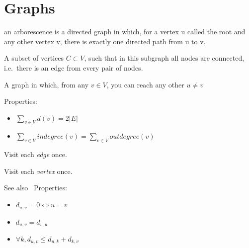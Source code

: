 \section{Graphs}

\begin{definition}[Arborescence]
    an arborescence is a directed graph in which, for a vertex u called the
    root and any other vertex v, there is exactly one directed path from u to v.
 \end{definition}

\begin{definition}[Clique]
    A subset of vertices $C \subset V$, such that in this subgraph all nodes
    are connected, i.e.\ there is an edge from every pair of nodes.
\end{definition}

\begin{definition}
    A graph in which, from any $v \in V$, you can reach any other $u \neq v$
\end{definition}

\begin{definition}
    Properties:
    \begin{itemize}
        \item $\sum\limits_{v \in V}{d(v)} = 2|E|$
        \item $\sum\limits_{v \in V}{indegree(v)} = 
            \sum\limits_{v \in V}{outdegree(v)}$
    \end{itemize}
\end{definition}

\begin{definition}[Eularian]\label{eularian}
    Visit each \textit{edge} once.
\end{definition}

\begin{definition}[Hamiltonian]
    Visit each \textit{vertex} once.
\end{definition}

\begin{definition}\label{metric}
    See also~
    Properties:
    \begin{itemize}
        \item $d_{u,v} = 0 \iff u = v$
        \item $d_{u,v} = d_{v,u}$
        \item $\forall k, d_{u,v} \leq d_{u,k} + d_{k,v}$
    \end{itemize}
\end{definition}

